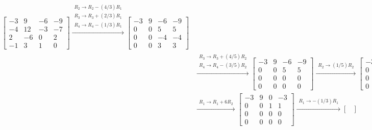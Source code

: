 \documentclass{article}
\begin{document}
\begin{itemize}
\begin{align*}
\begin{bmatrix}
-3 &   9 & -6 & -9 \\
-4 & 12 & -3 & -7 \\
 2 &  -6 &  0 &  2 \\ 
-1 &   3 &  1 &  0 
\end{bmatrix} \xrightarrow{\begin{array}{c} R_2 \rightarrow R_2 - (4/3)R_1 \\ R_3 \rightarrow R_3 + (2/3)R_1 \\ R_4 \rightarrow R_4 - (1/3)R_1 \end{array}} \begin{bmatrix}
-3 & 9 & -6 & -9 \\
 0 & 0 &  5 &   5 \\
 0 & 0 & -4 & -4 \\ 
 0 & 0 &  3 &  3
\end{bmatrix} \\
& \xrightarrow{\begin{array}{c} R_3 \rightarrow R_3 + (4/5)R_2 \\ R_4 \rightarrow R_4 - (3/5)R_2 \end{array}} \begin{bmatrix}
-3 & 9 & -6 & -9 \\
 0 & 0 &  5 &  5 \\
 0 & 0 &  0 &  0 \\ 
 0 & 0 &  0 &  0
\end{bmatrix} \xrightarrow{\begin{array}{c} R_2 \rightarrow (1/5)R_2 \end{array}} \begin{bmatrix}
-3 & 9 & -6 & -9 \\
 0 & 0 &  1 &  1 \\
 0 & 0 &  0 &  0 \\ 
 0 & 0 &  0 &  0 
\end{bmatrix} \\
& \xrightarrow{\begin{array}{c} R_1 \rightarrow R_1 + 6R_2 \end{array}} \begin{bmatrix}
-3 & 9 & 0 & -3 \\
 0 & 0 & 1 &  1 \\
 0 & 0 & 0 &  0 \\ 
 0 & 0 & 0 &  0 
\end{bmatrix} \xrightarrow{\begin{array}{c} R_1 \rightarrow -(1/3)R_1 \end{array}} \begin{bmatrix}

\end{bmatrix}
\end{align*}
\end{itemize}
\end{document}
